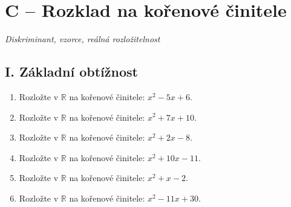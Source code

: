 \documentclass[11pt,a4paper]{article}
\begin{document}
\section*{C -- Rozklad na kořenové činitele}
\textit{Diskriminant, vzorce, reálná rozložitelnost}
\subsection*{I. Základní obtížnost}
\begin{enumerate}[label={},itemsep=5pt]
\item[\textbf{C001}] Rozložte v $\mathbb R$ na kořenové činitele: $x^{2} - 5x + 6$. 
\item[\textbf{C002}] Rozložte v $\mathbb R$ na kořenové činitele: $x^{2} + 7x + 10$. 
\item[\textbf{C003}] Rozložte v $\mathbb R$ na kořenové činitele: $x^{2} + 2x - 8$. 
\item[\textbf{C004}] Rozložte v $\mathbb R$ na kořenové činitele: $x^{2} + 10x - 11$. 
\item[\textbf{C005}] Rozložte v $\mathbb R$ na kořenové činitele: $x^{2} + x - 2$. 
\item[\textbf{C006}] Rozložte v $\mathbb R$ na kořenové činitele: $x^{2} - 11x + 30$. 
\end{enumerate}
\end{document}
